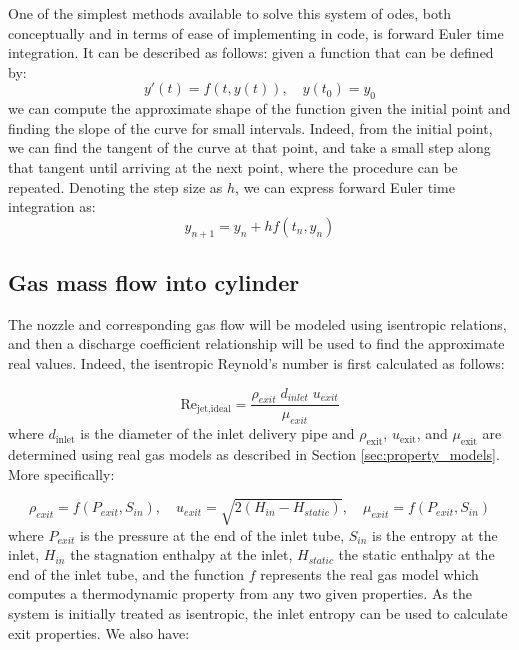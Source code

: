 One of the simplest methods available to solve this system of \glspl{ode}, both conceptually and in terms of ease of implementing in code, is forward Euler time integration. It can be described as follows: given a function that can be defined by: 
\begin{equation}
y'(t) = f(t,y(t)), \quad y(t_0) = y_0
\end{equation}
we can compute the approximate shape of the function given the initial point and finding the slope of the curve for small intervals. Indeed, from the initial point, we can find the tangent of the curve at that point, and take a small step along that tangent until arriving at the next point, where the procedure can be repeated. Denoting the step size as $h$, we can express forward Euler time integration as:
\begin{equation}
y_{n+1} =  y_n + hf(t_n,y_n)
\end{equation}


\subsection{Gas mass flow into cylinder}

The nozzle and corresponding gas flow will be modeled using isentropic relations, and then a discharge coefficient relationship will be used to find the approximate real values. Indeed, the isentropic Reynold's number is first calculated as follows:

\begin{equation}
\label{equ:reynoldsIdeal}
\text{Re}_{\text{jet,ideal}} = \frac{\rho_{exit}\;d_{inlet}\;u_{exit}}{\mu_{exit}}
\end{equation}
where $d_{\text{inlet}}$ is the diameter of the inlet delivery pipe and  $\rho_{\text{exit}}$, $u_{\text{exit}}$, and $\mu_{\text{exit}}$ are determined using real gas models as described in Section \ref{sec:property_models}. More specifically:

\begin{equation}
\rho_{exit} =  f\left(P_{exit}, S_{in}\right), \quad u_{exit} = \sqrt{2\left(H_{in} - H_{static}\right)}, \quad\mu_{exit}= f\left(P_{exit}, S_{in}\right)
\end{equation}
where $P_{exit}$ is the pressure at the end of the inlet tube, $S_{in}$ is the entropy at the inlet, $H_{in}$ the stagnation enthalpy at the inlet, $H_{static}$ the static enthalpy at the end of the inlet tube, and the function $f$ represents the real gas model which computes a thermodynamic property from any two given properties. As the system is initially treated as isentropic, the inlet entropy can be used to calculate exit properties. We also have:

